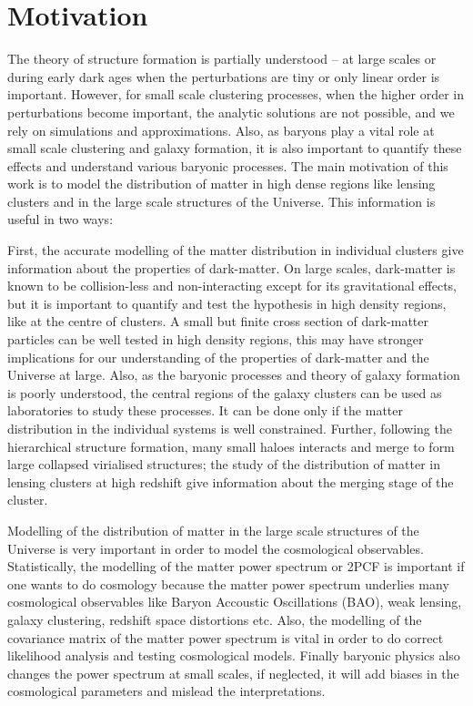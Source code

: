 

\section{Motivation}

The theory of structure formation is partially understood --  at large scales 
or during early dark ages when the perturbations are tiny or only linear order is important. 
However, for small scale clustering processes, when the higher order in perturbations 
become important, the analytic solutions are not possible, and we rely on simulations and 
approximations. Also, as baryons play a vital role at small scale clustering
and galaxy formation, it is also important to quantify these effects and 
understand various baryonic processes. 
The main motivation of this work is to model the distribution of matter in high dense
regions like lensing clusters and in the large scale structures of the Universe. 
This information is useful in two ways: 

First, the accurate modelling of the matter distribution in individual clusters
give information about the properties of dark-matter. On large scales, dark-matter
is known to be collision-less and non-interacting except for its gravitational effects,
but it is important to quantify and test the hypothesis in high density regions, like
at the centre of clusters. A small but finite cross section of dark-matter particles
can be well tested in high density regions, this may have stronger implications for our 
understanding of the properties of dark-matter and the Universe at large.  
Also, as the baryonic processes and theory of galaxy
formation is poorly understood, the central regions of the galaxy clusters can be 
used as laboratories to study these processes. It can be done only if the matter 
distribution in the individual systems is well constrained. 
Further, following the hierarchical structure formation, many small haloes interacts and
merge to form large collapsed virialised structures; the study of the distribution of 
matter in lensing clusters at high redshift give information about the merging
stage of the cluster. 

Modelling of the distribution of matter in the large scale structures of the  
Universe is very important
in order to model the cosmological observables. Statistically, the modelling of the
matter power spectrum or 2PCF is important if one wants to do cosmology because 
the matter power spectrum underlies many
cosmological observables like Baryon Accoustic Oscillations (BAO), 
weak lensing, galaxy clustering, redshift
space distortions etc. Also, the modelling of the 
covariance matrix of the matter power spectrum is vital in order to do correct
likelihood analysis and testing cosmological models. Finally baryonic physics 
also changes the power spectrum at small scales, if neglected, it will add biases
in the cosmological parameters and mislead the interpretations. 

